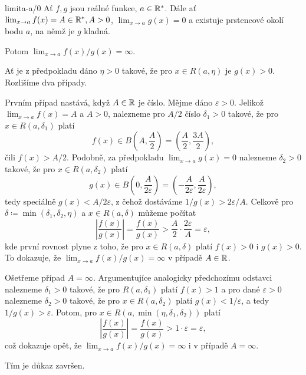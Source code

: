 \begin{proposition}{}{limita-a/0}
 Ať $f,g$ jsou reálné funkce, $a \in \mathbb{R}^{*}$. Dále ať $\lim_{x \to a} f(x) =
 A \in \mathbb{R}^{*}, A > 0$, $\lim_{x \to a} g(x) = 0$ a existuje prstencové okolí
 bodu $a$, na němž je $g$ kladná.

 Potom $\lim_{x \to a} f(x) / g(x) = \infty$.
\end{proposition}
\begin{propproof}
 Ať je z předpokladu dáno $\eta>0$ takové, že pro $x \in R(a,\eta)$ je $g(x) >
 0$. Rozlišíme dva případy.

 Prvním případ nastává, když $A \in \mathbb{R}$ je číslo. Mějme dáno $\varepsilon>0$.
 Jelikož $\lim_{x \to a} f(x) = A$ a $A > 0$, nalezneme pro $A / 2$ číslo
 $\delta_1 > 0$ takové, že pro $x \in R(a,\delta_1)$ platí
 \[
  f(x) \in B \left( A,\frac{A}{2} \right) = \left( \frac{A}{2}, \frac{3A}{2}
  \right),
 \]
 čili $f(x) > A / 2$. Podobně, za předpokladu $\lim_{x \to a} g(x) = 0$
 nalezneme $\delta_2>0$ takové, že pro $x \in R(a,\delta_2)$ platí
 \[
  g(x) \in B \left( 0,\frac{A}{2\varepsilon} \right) =
  \left(-\frac{A}{2\varepsilon},\frac{A}{2\varepsilon}\right),
 \]
 tedy speciálně $g(x) < A / 2\varepsilon$, z čehož dostáváme $1 / g(x) >
 2\varepsilon / A$. Celkově pro $\delta \coloneqq \min(\delta_1,\delta_2,\eta)$
 a $x \in R(a,\delta)$ můžeme počítat
 \[
  \left| \frac{f(x)}{g(x)} \right| = \frac{f(x)}{g(x)} > \frac{A}{2} \cdot
  \frac{2\varepsilon}{A} = \varepsilon,
 \]
 kde první rovnost plyne z toho, že pro $x \in R(a,\delta)$ platí $f(x) > 0$ i
 $g(x) > 0$. To dokazuje, že $\lim_{x \to a} f(x) / g(x) = \infty$ v případě
 $A \in \mathbb{R}$.

 Ošetřeme případ $A = \infty$. Argumentujíce analogicky předchozímu odstavci
 nalezneme $\delta_1>0$ takové, že pro $R(a,\delta_1)$ platí $f(x) > 1$ a pro
 dané $\varepsilon>0$ nalezneme $\delta_2>0$ takové, že pro $x \in
 R(a,\delta_2)$ platí $g(x) < 1 / \varepsilon$, a tedy $1 / g(x) > \varepsilon$.
 Potom, pro $x \in R(a,\min(\eta,\delta_1,\delta_2))$ platí
 \[
  \left| \frac{f(x)}{g(x)} \right| = \frac{f(x)}{g(x)} > 1 \cdot \varepsilon =
  \varepsilon,
 \]
 což dokazuje opět, že $\lim_{x \to a} f(x) / g(x) =\infty$ i v případě $A =
 \infty$. 

 Tím je důkaz završen.
\end{propproof}

